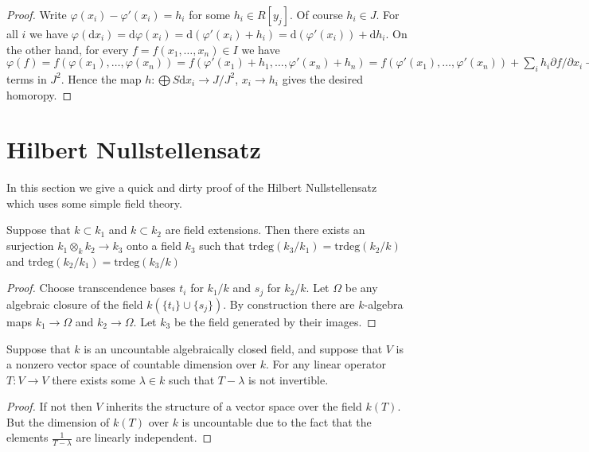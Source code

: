 \begin{proof}
\medskip\noindent
Write $\varphi(x_i) - \varphi'(x_i) = h_i$ for some
$h_i \in R[y_j]$. Of course $h_i \in J$. For all $i$ we have
$\varphi(\text{d}x_i) = \text{d}\varphi(x_i)
=\text{d}(\varphi'(x_i) + h_i) =
\text{d}(\varphi'(x_i)) + \text{d}h_i$. On the other hand,
for every $f = f(x_1,\ldots,x_n) \in I$ we have $\varphi(f) = 
f(\varphi(x_1),\ldots, \varphi(x_n)) =
f(\varphi'(x_1) + h_1,\ldots, \varphi'(x_n) + h_n) =
f(\varphi'(x_1),\ldots, \varphi'(x_n)) + 
\sum_i h_i \partial f/\partial x_i + $ terms in 
$J^2$. Hence the map $h : \bigoplus S\text{d}x_i \to J/J^2$,
$x_i \to h_i$ gives the desired homoropy.
\end{proof}

\section{Hilbert Nullstellensatz}
\label{section-nullstellensatz}

\noindent
In this section we give a quick and dirty proof
of the Hilbert Nullstellensatz which uses some
simple field theory.

\begin{lemma}
\label{lemma-tensor-fields}
Suppose that $k \subset k_1$ and $k\subset k_2$ are
field extensions. Then there exists an surjection
$k_1\otimes_k k_2 \to k_3$ onto a field $k_3$ such
that $\text{trdeg}(k_3/k_1) = \text{trdeg}(k_2/k)$
and  $\text{trdeg}(k_2/k_1) = \text{trdeg}(k_3/k)$
\end{lemma}

\begin{proof}
Choose transcendence bases $t_i$ for $k_1/k$ and
$s_j$ for $k_2/k$. Let $\Omega$ be any algebraic closure
of the field $k(\{t_i\}\cup \{s_j\})$. By construction
there are $k$-algebra maps $k_1 \to \Omega$ and
$k_2 \to \Omega$. Let $k_3$ be the field generated
by their images.
\end{proof}

\begin{lemma}
\label{lemma-dimension}
Suppose that $k$ is an uncountable algebraically closed field,
and suppose that $V$ is a nonzero vector space of countable dimension
over $k$. For any linear operator $T : V \to V$ there exists
some $\lambda \in k$ such that $T - \lambda$ is not invertible.
\end{lemma}

\begin{proof}
If not then $V$ inherits the structure of a vector space over
the field $k(T)$. But the dimension of $k(T)$ over $k$ is
uncountable due to the fact that the elements $\frac{1}{T - \lambda}$
are linearly independent.
\end{proof}

